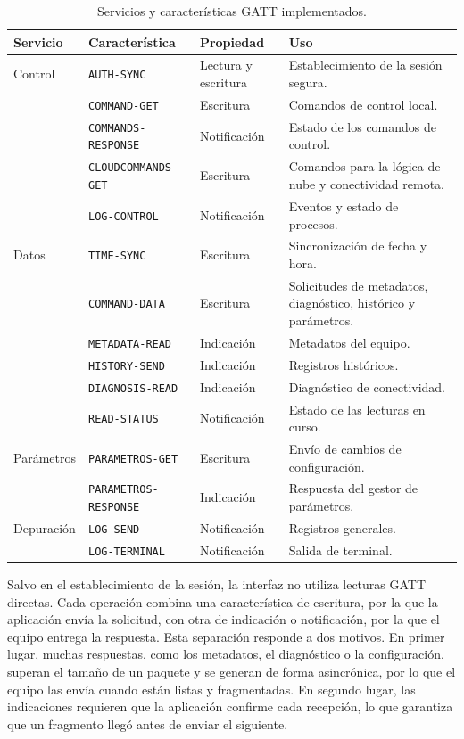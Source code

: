 \begin{table}[!h]
\centering
\caption{Servicios y características GATT implementados.}
\label{tab:servicios_gatt}
\footnotesize
\setlength{\tabcolsep}{4pt}
\begin{tabular}{L{0.12\textwidth} L{0.27\textwidth} L{0.14\textwidth} L{0.37\textwidth}}
\toprule
\textbf{Servicio} & \textbf{Característica} & \textbf{Propiedad} & \textbf{Uso} \\
\midrule
Control & \texttt{AUTH-SYNC} & Lectura y escritura & Establecimiento de la sesión segura. \\
 & \texttt{COMMAND-GET} & Escritura & Comandos de control local. \\
 & \texttt{COMMANDS-RESPONSE} & Notificación & Estado de los comandos de control. \\
 & \texttt{CLOUDCOMMANDS-GET} & Escritura & Comandos para la lógica de nube y conectividad remota. \\
 & \texttt{LOG-CONTROL} & Notificación & Eventos y estado de procesos. \\
\addlinespace
Datos & \texttt{TIME-SYNC} & Escritura & Sincronización de fecha y hora. \\
 & \texttt{COMMAND-DATA} & Escritura & Solicitudes de metadatos, diagnóstico, histórico y parámetros. \\
 & \texttt{METADATA-READ} & Indicación & Metadatos del equipo. \\
 & \texttt{HISTORY-SEND} & Indicación & Registros históricos. \\
 & \texttt{DIAGNOSIS-READ} & Indicación & Diagnóstico de conectividad. \\
 & \texttt{READ-STATUS} & Notificación & Estado de las lecturas en curso. \\
\addlinespace
Parámetros & \texttt{PARAMETROS-GET} & Escritura & Envío de cambios de configuración. \\
 & \texttt{PARAMETROS-RESPONSE} & Indicación & Respuesta del gestor de parámetros. \\
\addlinespace
Depuración & \texttt{LOG-SEND} & Notificación & Registros generales. \\
 & \texttt{LOG-TERMINAL} & Notificación & Salida de terminal. \\
\bottomrule
\end{tabular}
\end{table}

Salvo en el establecimiento de la sesión, la interfaz no utiliza lecturas GATT directas. Cada operación combina una característica de escritura, por la que la aplicación envía la solicitud, con otra de indicación o notificación, por la que el equipo entrega la respuesta. Esta separación responde a dos motivos. En primer lugar, muchas respuestas, como los metadatos, el diagnóstico o la configuración, superan el tamaño de un paquete y se generan de forma asincrónica, por lo que el equipo las envía cuando están listas y fragmentadas. En segundo lugar, las indicaciones requieren que la aplicación confirme cada recepción, lo que garantiza que un fragmento llegó antes de enviar el siguiente.

